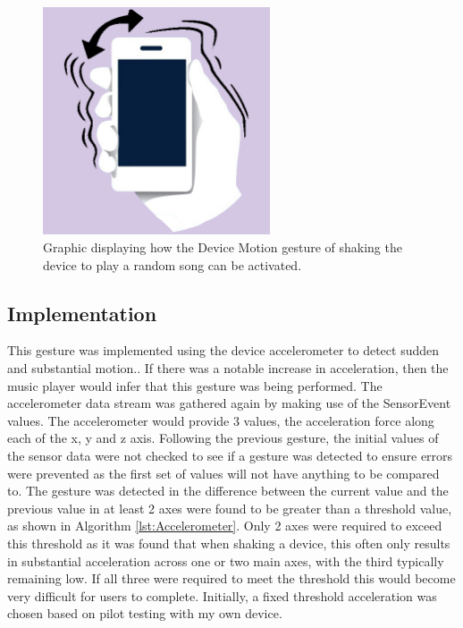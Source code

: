\documentclass{l4proj}
\begin{document}
\begin{figure}[!htb]
    \centering
    \includegraphics[width=0.6\textwidth]{images/shaking.png}
        \caption{Graphic displaying how the Device Motion gesture of shaking the device to play a random song can be activated.}
        \label{fig:Dev-Mot}
\end{figure}

\subsection{Implementation}
This gesture was implemented using the device accelerometer to detect sudden and substantial motion.. If there was a notable increase in acceleration, then the music player would infer that this gesture was being performed. The accelerometer data stream was gathered again by making use of the SensorEvent values. The accelerometer would provide 3 values, the acceleration force along each of the x, y and z axis. Following the previous gesture, the initial values of the sensor data  were not checked to see if a gesture was detected to ensure errors were prevented as the first set of values will not have anything to be compared to. The gesture was detected in the difference between the current value and the previous value in at least 2 axes were found to be greater than a threshold value, as shown in Algorithm \ref{lst:Accelerometer}. Only 2 axes were required to exceed this threshold as it was found that when shaking a device, this often only results in substantial acceleration across one or two main axes, with the third typically remaining low. If all three were required to meet the threshold this would become very difficult for users to complete. Initially, a fixed threshold acceleration was chosen based on pilot testing with my own device.
\end{document}
